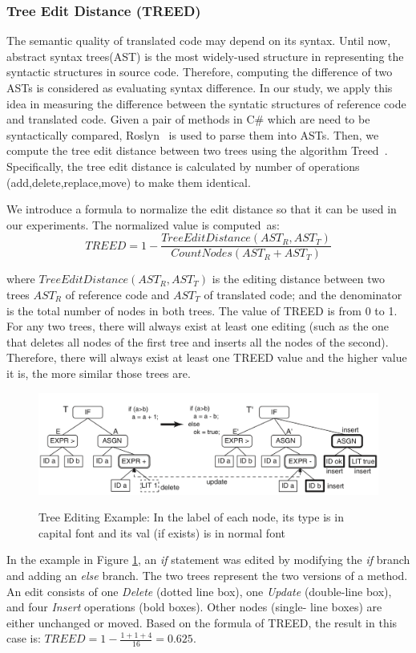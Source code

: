 \subsubsection{\textbf{Tree Edit Distance (TREED)}}  

The semantic quality of translated code may depend on its
syntax. Until now, abstract syntax trees(AST) is the most widely-used
structure in representing the syntactic structures in source
code. Therefore, computing the difference of two ASTs is considered as
evaluating syntax difference.  In our study, we apply this idea in
measuring the difference between the syntatic structures of reference
code and translated code. Given a pair of methods in C\# which are
need to be syntactically compared, Roslyn~\cite{tien} is used to parse
them into ASTs. Then, we compute the tree edit distance between two
trees using the algorithm Treed~\cite{oopsla10}.  Specifically, the
tree edit distance is calculated by number of operations
(add,delete,replace,move) to make them identical.

We introduce a formula to normalize the edit distance so that it can
be used in our experiments. The normalized value is computed~as:
\[TREED = 1 -  \frac{TreeEditDistance\left(AST_R, AST_T\right)}{CountNodes \left(AST_R+AST_T\right)}\] 
  
where $TreeEditDistance\left(AST_R, AST_T\right)$ is the editing
distance between two trees $AST_R$ of reference code and $AST_T$ of
translated code; and the denominator is the total number of nodes in
both trees. The value of TREED is from 0 to 1.
%
For any two trees, there will always exist at least one editing (such
as the one that deletes all nodes of the first tree and inserts all
the nodes of the second). Therefore, there will always exist at least
one TREED value and the higher value it is, the more similar those
trees are.

\begin{figure}[h]
	\caption{Tree Editing Example: In the label of each node, its type is in capital font and its val (if exists) is in normal font}
	\includegraphics[scale=0.3]{img/treed.png}
	\centering
	\label{fig:treed}
\end{figure}

In the example in Figure \ref{fig:treed}, an \textit{if} statement was
edited by modifying the \textit{if} branch and adding an \textit{else}
branch. The two trees represent the two versions of a method. An edit
consists of one \textit{Delete} (dotted line box), one \textit{Update}
(double-line box), and four \textit{Insert} operations (bold
boxes). Other nodes (single- line boxes) are either unchanged or
moved. Based on the formula of TREED, the result in this case is:
$TREED = 1 - \frac{1 + 1 + 4}{16}=0.625$.



